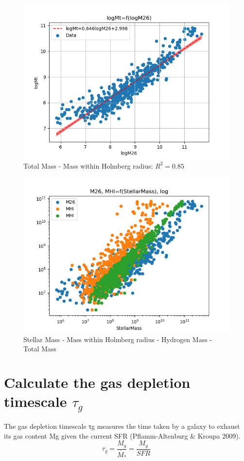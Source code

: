 \documentclass[a4paper]{article}
\begin{document}
\begin{figure}[htbp]
\centering
\includegraphics[width=.9\linewidth]{./graphs/logM26-logMt.png}
\caption{\label{Total Mass - Mass within Holmberg radius}Total Mass - Mass within Holmberg radius: \(R^2=0.85\)}
\end{figure}


\begin{figure}[htbp]
\centering
\includegraphics[width=.9\linewidth]{./graphs/M-MHI-M26.png}
\caption{\label{Stellar Mass - Mass within Holmberg radius - Hydrogen Mass - Total Mass}Stellar Mass - Mass within Holmberg radius - Hydrogen Mass - Total Mass}
\end{figure}


\section{Calculate the gas depletion timescale \(\tau_g\)}
\label{sec:orgf5cea8c}

The gas depletion timescale τg measures the time taken by a galaxy to exhaust its gas content Mg given the current SFR (Pflamm-Altenburg \& Kroupa 2009).
$$
\tau_g=\frac{M_g}{\dot{M_*}}=\frac{M_g}{SFR}
$$
\end{document}
